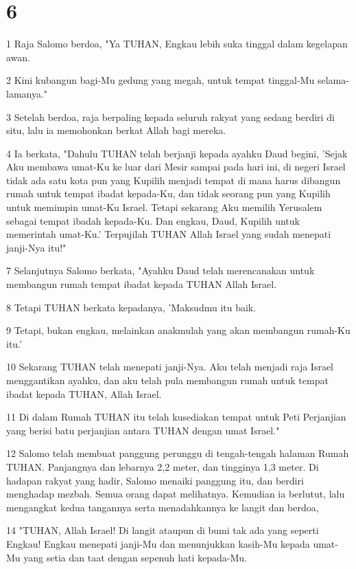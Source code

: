 \chapter{6}

\par 1 Raja Salomo berdoa, "Ya TUHAN, Engkau lebih suka tinggal dalam kegelapan awan.
\par 2 Kini kubangun bagi-Mu gedung yang megah, untuk tempat tinggal-Mu selama-lamanya."
\par 3 Setelah berdoa, raja berpaling kepada seluruh rakyat yang sedang berdiri di situ, lalu ia memohonkan berkat Allah bagi mereka.
\par 4 Ia berkata, "Dahulu TUHAN telah berjanji kepada ayahku Daud begini, 'Sejak Aku membawa umat-Ku ke luar dari Mesir sampai pada hari ini, di negeri Israel tidak ada satu kota pun yang Kupilih menjadi tempat di mana harus dibangun rumah untuk tempat ibadat kepada-Ku, dan tidak seorang pun yang Kupilih untuk memimpin umat-Ku Israel. Tetapi sekarang Aku memilih Yerusalem sebagai tempat ibadah kepada-Ku. Dan engkau, Daud, Kupilih untuk memerintah umat-Ku.' Terpujilah TUHAN Allah Israel yang sudah menepati janji-Nya itu!"
\par 7 Selanjutnya Salomo berkata, "Ayahku Daud telah merencanakan untuk membangun rumah tempat ibadat kepada TUHAN Allah Israel.
\par 8 Tetapi TUHAN berkata kepadanya, 'Maksudmu itu baik.
\par 9 Tetapi, bukan engkau, melainkan anakmulah yang akan membangun rumah-Ku itu.'
\par 10 Sekarang TUHAN telah menepati janji-Nya. Aku telah menjadi raja Israel menggantikan ayahku, dan aku telah pula membangun rumah untuk tempat ibadat kepada TUHAN, Allah Israel.
\par 11 Di dalam Rumah TUHAN itu telah kusediakan tempat untuk Peti Perjanjian yang berisi batu perjanjian antara TUHAN dengan umat Israel."
\par 12 Salomo telah membuat panggung perunggu di tengah-tengah halaman Rumah TUHAN. Panjangnya dan lebarnya 2,2 meter, dan tingginya 1,3 meter. Di hadapan rakyat yang hadir, Salomo menaiki panggung itu, dan berdiri menghadap mezbah. Semua orang dapat melihatnya. Kemudian ia berlutut, lalu mengangkat kedua tangannya serta menadahkannya ke langit dan berdoa,
\par 14 "TUHAN, Allah Israel! Di langit ataupun di bumi tak ada yang seperti Engkau! Engkau menepati janji-Mu dan menunjukkan kasih-Mu kepada umat-Mu yang setia dan taat dengan sepenuh hati kepada-Mu.

